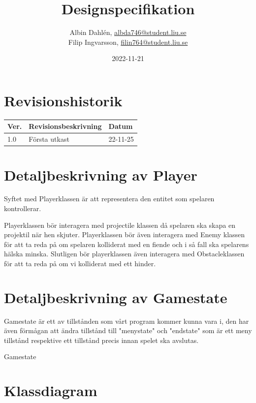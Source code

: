 \documentclass{TDP005mall}
\author{Albin Dahlén, \url{albda746@student.liu.se}\\
  Filip Ingvarsson, \url{filin764@student.liu.se}}
\title{Designspecifikation}
\date{2022-11-21}
\begin{document}
\projectpage
\section{Revisionshistorik}
\begin{table}[!h]
\begin{tabularx}{\linewidth}{|l|X|l|}
\hline
Ver. & Revisionsbeskrivning & Datum \\\hline
1.0 & Första utkast & 22-11-25 \\\hline
\end{tabularx}
\end{table}

\section{Detaljbeskrivning av Player}
Syftet med Playerklassen är att representera den entitet som spelaren kontrollerar.

Playerklassen bör interagera med projectile klassen då spelaren ska skapa en projektil när hen skjuter.
Playerklassen bör även interagera med Enemy klassen för att ta reda på om spelaren kolliderat med en fiende och i så fall ska spelarens hälska minska.
Slutligen bör playerklassen även interagera med Obstacleklassen för att ta reda på om vi kolliderat med ett hinder.

\section{Detaljbeskrivning av Gamestate}
Gamestate är ett av tillstånden som vårt program kommer kunna vara i, den har även förmågan att ändra tillstånd till "menystate" och "endstate" som är ett meny tillstånd respektive
ett tillstånd precis innan spelet ska avslutas.

Gamestate 


\section{Klassdiagram}
\end{document}
